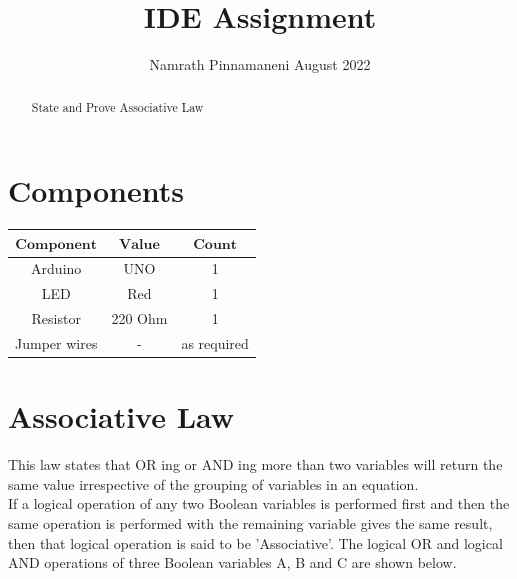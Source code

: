 \documentclass[letterpaper, 10 pt, conference]{ieeeconf}
\title{\LARGE \bf
IDE Assignment
}
\author{Namrath Pinnamaneni \hspace{9cm} August 2022}
\begin{document}
\maketitle

\begin{abstract}
State and Prove Associative Law
\end{abstract}
\tableofcontents

\section{Components}\hfill\break
{
\centering
\begin{tabular}{|c|c|c|}
\hline
$\boldsymbol{Component}$&$\boldsymbol{Value}$&$\boldsymbol{Count}$\\
\hline
Arduino&UNO&1\\
\hline
LED&Red&1\\
\hline
Resistor&220 Ohm&1\\
\hline
Jumper wires&-&as required\\
\hline
\end{tabular}\par
}
\vspace{5mm} %
\section{Associative Law}
This law states that OR ing or AND ing more than two variables will return the same value irrespective of the grouping of variables in an equation.\\
If a logical operation of any two Boolean variables is performed first and then the same operation is performed with the remaining variable gives the same result, then that logical operation is said to be 'Associative'. The logical OR and logical AND operations of three Boolean variables A, B and C are shown below.
 
\end{document}
